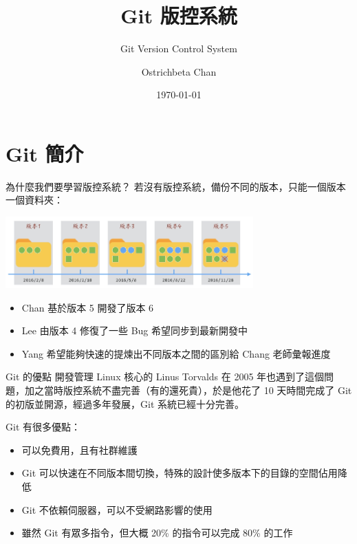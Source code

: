 \documentclass[xetex, unicode, 10pt, aspectratio=169]{beamer}
\title{Git 版控系統}
\subtitle{Git Version Control System}
\date{\today}
\author{Ostrichbeta Chan}
\institute{WHUAI Team}
\begin{document}
\maketitle

\section{Git 簡介}

\begin{frame}{為什麼我們要學習版控系統？}
    若沒有版控系統，備份不同的版本，只能一個版本一個資料夾：
    \begin{center}
        \includegraphics[width=3.75in]{./img/folders-without-vcs.png}
    \end{center}
    \begin{itemize}
        \item Chan 基於版本 5 開發了版本 6
        \item Lee 由版本 4 修復了一些 Bug 希望同步到最新開發中
        \item Yang 希望能夠快速的提煉出不同版本之間的區別給 Chang 老師彙報進度
    \end{itemize}
    \pause
    \begin{center}
    \end{center}
\end{frame}

\begin{frame}{Git 的優點}
    開發管理 Linux 核心的 Linus Torvalds 在 2005
    年也遇到了這個問題，加之當時版控系統不盡完善（有的還死貴），於是他花了 10 天時間完成了 Git 的初版並開源，經過多年發展，Git 系統已經十分完善。
    \pause

    Git 有很多優點：

    \begin{itemize}
        \item {}\quad{}可以免費用，且有社群維護
        \item {}\quad{}Git 可以快速在不同版本間切換，特殊的設計使多版本下的目錄的空間佔用降低
        \item {}\quad{}Git 不依賴伺服器，可以不受網路影響的使用
        \item {}\quad{}雖然 Git 有眾多指令，但大概 20\% 的指令可以完成 80\% 的工作
    \end{itemize}
\end{frame}
\end{document}
